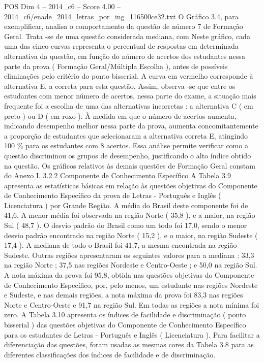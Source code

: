 \begin{textsample}{POS Dim 4 – 2014\_c6 – Score 4.00 – 2014\_c6/enade\_2014\_letras\_por\_ing\_116500ce32.txt}
O Gráfico 3.4, para exemplificar, analisa o comportamento da questão de número 7 de Formação Geral.
Trata -se de uma questão considerada mediana, com Neste gráfico, cada uma das cinco curvas representa o percentual de respostas em determinada alternativa da questão, em função do número de acertos dos estudantes nessa parte da prova ( Formação Geral/Múltipla Escolha ), antes de possíveis eliminações pelo critério do ponto bisserial.
A curva em vermelho corresponde à alternativa E, a correta para esta questão.
Assim, observa -se que entre os estudantes com menor número de acertos, nessa parte do exame, a situação mais frequente foi a escolha de uma das alternativas incorretas : a alternativa C ( em preto ) ou D ( em roxo ).
À medida em que o número de acertos aumenta, indicando desempenho melhor nessa parte da prova, aumenta concomitantemente a proporção de estudantes que selecionaram a alternativa correta E, atingindo 100 \% para os estudantes com 8 acertos.
Essa análise permite verificar como a questão discriminou os grupos de desempenho, justificando o alto índice obtido na questão.
Os gráficos relativos às demais questões de Formação Geral constam do Anexo I. 3.2.2 Componente de Conhecimento Específico A Tabela 3.9 apresenta as estatísticas básicas em relação às questões objetivas do Componente de Conhecimento Específico da prova de Letras - Português e Inglês ( Licenciatura ) por Grande Região.
A média do Brasil deste componente foi de 41,6.
A menor média foi observada na região Norte ( 35,8 ), e a maior, na região Sul ( 48,7 ).
O desvio padrão do Brasil como um todo foi 17,0, sendo o menor desvio padrão encontrado na região Norte ( 15,2 ), e o maior, na região Sudeste ( 17,4 ).
A mediana de todo o Brasil foi 41,7, a mesma encontrada na região Sudeste.
Outras regiões apresentaram os seguintes valores para a mediana : 33,3 na região Norte ; 37,5 nas regiões Nordeste e Centro-Oeste ; e 50,0 na região Sul.
A nota máxima da prova foi 95,8, obtida nas questões objetivas do Componente de Conhecimento Específico, por, pelo menos, um estudante nas regiões Nordeste e Sudeste, e nas demais regiões, a nota máxima da prova foi 83,3 nas regiões Norte e Centro-Oeste e 91,7 na região Sul.
Em todas as regiões a nota mínima foi zero.
A Tabela 3.10 apresenta os índices de facilidade e discriminação ( ponto bisserial ) das questões objetivas do Componente de Conhecimento Específico para os estudantes de Letras - Português e Inglês ( Licenciatura ).
Para facilitar a diferenciação das questões, foram usadas as mesmas cores da Tabela 3.8 para as diferentes classificações dos índices de facilidade e de discriminação.

\end{textsample}
